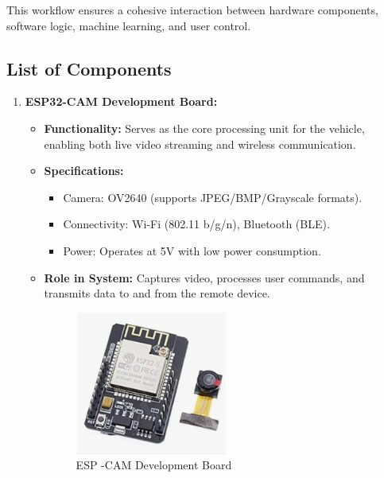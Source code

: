 \documentclass[12pt,a4paper]{report}
\begin{document}
This workflow ensures a cohesive interaction between hardware components, software logic, machine learning, and user control.











\label{List of Components}
\subsection{List of Components}

\begin{enumerate}
    \item \textbf{ESP32-CAM Development Board:}
    \begin{itemize}
        \item \textbf{Functionality:} Serves as the core processing unit for the vehicle, enabling both live video streaming and wireless communication.
        \item \textbf{Specifications:}
        \begin{itemize}
            \item Camera: OV2640 (supports JPEG/BMP/Grayscale formats).
            \item Connectivity: Wi-Fi (802.11 b/g/n), Bluetooth (BLE).
            \item Power: Operates at 5V with low power consumption.
        \end{itemize}
        \item \textbf{Role in System:} Captures video, processes user commands, and transmits data to and from the remote device. \\ 
\begin{figure}[H]
    \centering
    \includegraphics[width=0.5\textwidth]{espCam}
    \caption{ESP -CAM Development Board}
    \label{fig:espCam}
\end{figure}
 

\end{itemize}
\end{enumerate}
\end{document}
